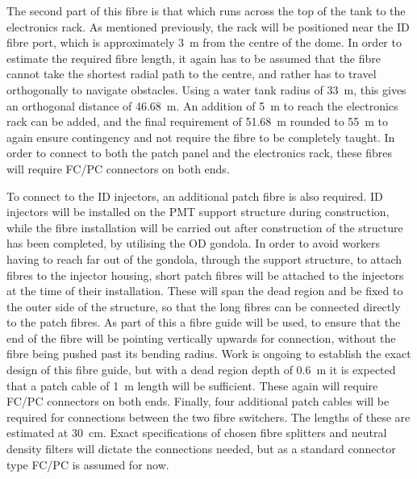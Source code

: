 \documentclass[a4paper,11pt]{article}
\begin{document}
The second part of this fibre is that which runs across the top of the tank to the electronics rack. As mentioned previously, the rack will be positioned near the ID fibre port, which is approximately 3~m from the centre of the dome. In order to estimate the required fibre length, it again has to be assumed that the fibre cannot take the shortest radial path to the centre, and rather has to travel orthogonally to navigate obstacles. Using a water tank radius of 33~m, this gives an orthogonal distance of 46.68~m. An addition of 5~m to reach the electronics rack can be added, and the final requirement of 51.68~m rounded to 55~m to again ensure contingency and not require the fibre to be completely taught. In order to connect to both the patch panel and the electronics rack, these fibres will require FC/PC connectors on both ends.

To connect to the ID injectors, an additional patch fibre is also required. ID injectors will be installed on the PMT support structure during construction, while the fibre installation will be carried out after construction of the structure has been completed, by utilising the OD gondola. In order to avoid workers having to reach far out of the gondola, through the support structure, to attach fibres to the injector housing, short patch fibres will be attached to the injectors at the time of their installation. These will span the dead region and be fixed to the outer side of the structure, so that the long fibres can be connected directly to the patch fibres. As part of this a fibre guide will be used, to ensure that the end of the fibre will be pointing vertically upwards for connection, without the fibre being pushed past its bending radius. Work is ongoing to establish the exact design of this fibre guide, but with a dead region depth of 0.6~m it is expected that a patch cable of 1~m length will be sufficient. These again will require FC/PC connectors on both ends. Finally, four additional patch cables will be required for connections between the two fibre switchers. The lengths of these are estimated at 30~cm. Exact specifications of chosen fibre splitters and neutral density filters will dictate the connections needed, but as a standard connector type FC/PC is assumed for now.
\end{document}
